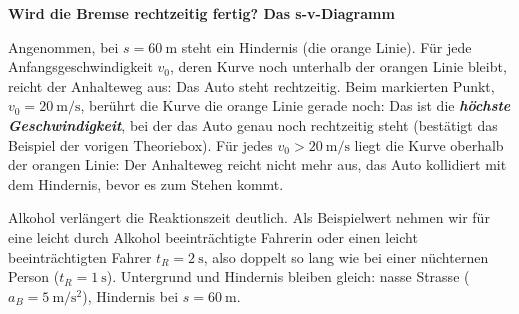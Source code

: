 \documentclass[addpoints,11pt,a4paper]{exam}
\newenvironment{theoriebox}[1][Theorie]{%
  \par\addvspace{10pt}\noindent\textbf{#1}\par\smallskip\noindent
}{%
  \par\addvspace{10pt}
}
\newlength{\antwortraumlen}
\newcommand{\Antwortraum}[1]{%
  \pgfmathsetlength{\antwortraumlen}{#1*2.5cm}%
  \begin{answerbox}
    \rule{0pt}{\antwortraumlen}%
  \end{answerbox}%
}
\begin{document}
\begin{theoriebox}[Wird die Bremse rechtzeitig fertig? Das s-v-Diagramm]
Angenommen, bei $s=\SI{60}{\meter}$ steht ein Hindernis (die orange
Linie). Für jede Anfangsgeschwindigkeit $v_0$, deren Kurve noch
unterhalb der orangen Linie bleibt, reicht der Anhalteweg aus: Das Auto
steht rechtzeitig. Beim markierten Punkt, $v_0=\SI{20}{\meter\per\second}$,
berührt die Kurve die orange Linie gerade noch: Das ist die
\textbf{\emph{höchste Geschwindigkeit}}, bei der das Auto genau noch
rechtzeitig steht (bestätigt das Beispiel der vorigen Theoriebox). Für
jedes $v_0>\SI{20}{\meter\per\second}$ liegt die Kurve oberhalb der
orangen Linie: Der Anhalteweg reicht nicht mehr aus, das Auto
kollidiert mit dem Hindernis, bevor es zum Stehen kommt.
\end{theoriebox}

\begin{questions}
\begin{taskbox}
\question[9] Alkohol verlängert die Reaktionszeit deutlich. Als
Beispielwert nehmen wir für eine leicht durch Alkohol beeinträchtigte
Fahrerin oder einen leicht beeinträchtigten Fahrer
$t_R=\SI{2}{\second}$, also doppelt so lang wie bei einer nüchternen
Person ($t_R=\SI{1}{\second}$). Untergrund und Hindernis bleiben
gleich: nasse Strasse ($a_B=\SI{5}{\meter\per\second\squared}$),
Hindernis bei $s=\SI{60}{\meter}$.

\end{taskbox}
\end{questions}
\end{document}
